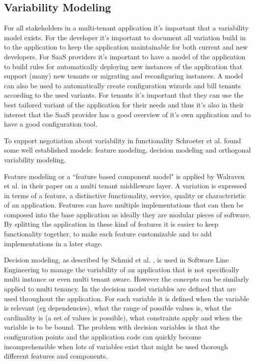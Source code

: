
\subsection{Variability Modeling}
For all stakeholders in a multi-tenant application it's important that a variability model exists. For the developer it's important to document all variation build in to the application to keep the application maintainable for both current and new developers. 
For SaaS providers it's important to have a model of the application to build rules for automatically deploying new instances of the application that support (many) new tenants or migrating and reconfiguring instances. 
A model can also be used to automatically create configuration wizards and bill tenants according to the used variants. 
For tenants it's important that they can use the best tailored variant of the application for their needs and thus it's also in their interest that the SaaS provider has a good overview of it's own application and to have a good configuration tool.

To support negotiation about variability in functionality Schroeter et al. \cite{schroeter2012towards} found some well established models: feature modeling, decision modeling and orthogonal variability modeling.

Feature modeling or a ``feature based component model" is applied by Walraven et al. \cite{walraven2011middleware} in their paper on a multi tenant middleware layer. A variation is
expressed in terms of a feature, a distinctive functionality, service, quality or characteristic of an 
application. Features can have multiple implementations that can then be composed into the 
base application as ideally they are modular pieces of software. By splitting the application in 
these kind of features it is easier to keep functionality together, to make each feature 
customizable and to add implementations in a later stage.

Decision modeling, as described by Schmid et al. \cite{schmid2004customizable}, is used in 
Software Line Engineering to manage the variability of an application that is not specifically 
multi instance or even multi tenant aware. However the concepts can be similarly applied to 
multi tenancy. In the decision model variables are defined that are used throughout the 
application. For each variable it is defined when the variable is relevant (eg dependencies), 
what the range of possible values is, what the cardinality is (a set of values is possible), what 
constraints apply and when the variable is to be bound. The problem with decision variables is 
that the configuration points and the application code can quickly become incomprehensible 
when lots of variables exist that might be used thorough different features and components.

